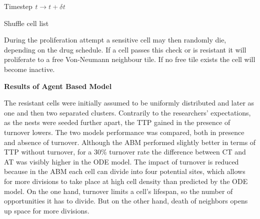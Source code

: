 \documentclass[11pt,a4paper]{article}
\begin{document}
\NoCaptionOfAlgo
\begin{algorithm}[H]

\SetAlgoLined
\DontPrintSemicolon
{}
\SetAlCapSkip{1em}
\SetAlCapNameFnt{\normalfont\normalsize}
\caption{Timestep $\textcolor{darkgray}{t \to t + \delta t}$}

Shuffle cell list\;
\end{algorithm}

During the proliferation attempt a sensitive cell may then randomly die, depending on the drug schedule. If a cell passes this check or is resistant it will proliferate
 to a free Von-Neumann neighbour tile. If no free tile exists the cell will become inactive. \\


\vspace{2mm}

\textbf{Results of Agent Based Model}

 \vspace{1mm}

The resistant cells were initially assumed to be uniformly distributed and later as one and then two separated clusters. Contrarily to the researchers’ expectations, as the nests were seeded further apart,
the TTP gained in the presence of turnover lowers. 
The two models performance was compared, both in presence and absence of turnover. Although the ABM performed slightly better in terms of TTP without turnover, for a 30\% turnover rate the difference between CT and AT was visibly higher in the ODE model.
The impact of turnover is reduced because in the ABM each cell can divide into four potential sites, which allows for more divisions to take place at high cell density than predicted by the ODE model.
On the one hand, turnover limits a cell’s lifespan, so the number of opportunities it has to divide. But on the other hand, death of neighbors opens up space for more divisions. \\
\end{document}
